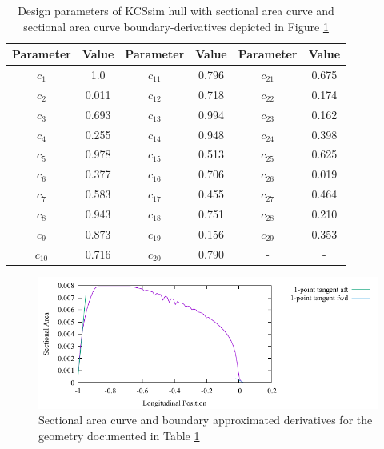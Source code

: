 \documentclass{report}
\begin{document}
\begin{table}[H]
    \centering
    \begin{tabular}{|c|c|c|c|c|c|}
        \hline 
        Parameter & Value & Parameter & Value & Parameter & Value\\
        \hline 
        $c_1$ & 1.0 & $c_{11}$ & 0.796 & $c_{21}$ & 0.675 \\
        \hline 
        $c_2$ & 0.011 & $c_{12}$ & 0.718 & $c_{22}$ & 0.174\\
        \hline 
        $c_3$ & 0.693 & $c_{13}$ & 0.994 & $c_{23}$ & 0.162 \\
        \hline 
        $c_4$ & 0.255 & $c_{14}$ & 0.948 & $c_{24}$ & 0.398 \\
        \hline 
        $c_5$ & 0.978 & $c_{15}$ & 0.513 & $c_{25}$ & 0.625 \\
        \hline 
        $c_6$ & 0.377 & $c_{16}$ & 0.706 & $c_{26}$ & 0.019 \\
        \hline 
        $c_7$ & 0.583 & $c_{17}$ & 0.455 & $c_{27}$ & 0.464 \\
        \hline 
        $c_8$ & 0.943 & $c_{18}$ & 0.751 & $c_{28}$ & 0.210 \\
        \hline 
        $c_9$ & 0.873 & $c_{19}$ & 0.156 & $c_{29}$ & 0.353 \\
        \hline 
        $c_{10}$ & 0.716 & $c_{20}$ & 0.790 & - & - \\
        \hline 
    \end{tabular}
    \caption{Design parameters of KCSsim hull with sectional area curve and 
    sectional area curve boundary-derivatives depicted in Figure
    \ref{fig:test-4-sac-13}}
    \label{tab:test-4-13}
\end{table}
\begin{figure}[H]
    \centering
    \includegraphics[width = 0.7\linewidth]{figures/test-4-sac-13.pdf}
    \caption{Sectional area curve and boundary approximated derivatives for
    the geometry documented in Table \ref{tab:test-4-13}}
    \label{fig:test-4-sac-13}
\end{figure}
\end{document}

